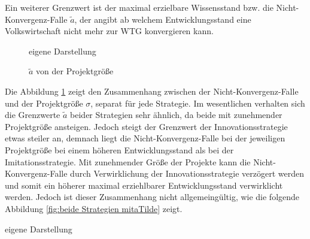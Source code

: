 Ein weiterer Grenzwert ist der maximal erzielbare Wissensstand bzw. die Nicht-Konvergenz-Falle $\tilde{a}$, der angibt ab welchem Entwicklungsstand eine Volkswirtschaft nicht mehr zur WTG konvergieren kann.\\
%
	\begin{figure}[htbp]
		\hfill{}  eigene Darstellung
		\caption{$\widetilde{a}$ von der Projektgröße} 
		\label{fig:aTilde}
	\end{figure}
%
Die Abbildung \ref{fig:aTilde} zeigt den Zusammenhang zwischen der Nicht-Konvergenz-Falle und der Projektgröße $\sigma$, separat für jede Strategie. Im wesentlichen verhalten sich die Grenzwerte $\tilde{a}$ beider Strategien sehr ähnlich, da beide mit zunehmender Projektgröße ansteigen. Jedoch steigt der Grenzwert der \textcolor[rgb]{0.74,0.97,0.22}{Innovationsstrategie} etwas steiler an, demnach liegt die Nicht-Konvergenz-Falle bei der jeweiligen Projektgröße bei einem höheren Entwicklungsstand als bei der \textcolor[rgb]{0,0.32,0}{Imitationsstrategie}. Mit zunehmender Größe der Projekte kann die Nicht-Konvergenz-Falle durch Verwirklichung der \textcolor[rgb]{0.74,0.97,0.22}{Innovationsstrategie} verzögert werden und somit ein höherer maximal erziehlbarer Entwicklungsstand verwirklicht werden. Jedoch ist dieser Zusammenhang nicht allgemeingültig, wie die folgende Abbildung \ref{fig:beide Strategien mitaTilde} zeigt. \\
%
	\begin{figure*}[htbp]
		\hfill{}  eigene Darstellung
		\caption{beide Strategien mit $\widetilde{a}$}
		\label{fig:beide Strategien mitaTilde}
	\end{figure*}
